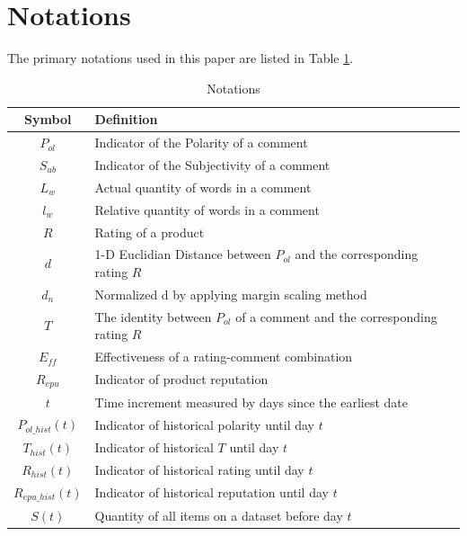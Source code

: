 \documentclass[12pt]{article}  %
\begin{document}
\newpage
\section{Notations}
The primary notations used in this paper are listed in Table \ref{tb:notation}.
\begin{table}[H]
\begin{center}
\caption{Notations}
\begin{tabular}{cl}
	\toprule
	\multicolumn{1}{m{3cm}}{\centering Symbol}
	&\multicolumn{1}{m{12cm}}{\centering Definition}\\
	\midrule
  $P_{ol}$&Indicator of the Polarity of a comment\\

$S_{ub}$&Indicator of the Subjectivity of a comment\\

$L_{w}$&Actual quantity of words in a comment\\

$l_{w}$&Relative quantity of words in a comment\\

${R}$&Rating of a product\\

$d$&1-D Euclidian Distance between $P_{ol}$ and the corresponding rating ${R}$\\

$d_{n}$&Normalized d by applying margin scaling method\\

$T$&The identity between $P_{ol}$ of a comment and the corresponding rating ${R}$\\

  $E_{ff}$&Effectiveness of a rating-comment combination\\
  $R_{epu}$&Indicator of product reputation\\

$t$&Time increment measured by days since the earliest date\\

$P_{ol\_hist}(t)$&Indicator of historical polarity until day $t$\\

$T_{hist}(t)$&Indicator of historical $T$ until day $t$\\

$R_{hist}(t)$&Indicator of historical rating until day $t$\\

$R_{epu\_hist}(t)$&Indicator of historical reputation until day $t$\\

$S(t)$&Quantity of all items on a dataset before day $t$\\
	\bottomrule
\end{tabular}\label{tb:notation}
\end{center}
\end{table}
\end{document}
